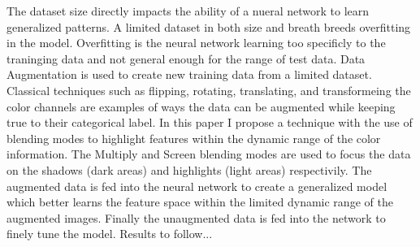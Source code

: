 % 
% 
%
The dataset size directly impacts the ability of a nueral network to learn generalized patterns.  A limited dataset in both size and breath breeds overfitting in the model.  Overfitting is the neural network learning too specificly to the traninging data and not general enough for the range of test data.  Data Augmentation is used to create new training data from a limited dataset.  Classical techniques such as flipping, rotating, translating, and transformeing the color channels are examples of ways the data can be augmented while keeping true to their categorical label.  In this paper I propose a technique with the use of blending modes to highlight features within the dynamic range of the color information.  The Multiply and Screen blending modes are used to focus the data on the shadows (dark areas) and highlights (light areas) respectivily.  The augmented data is fed into the neural network to create a generalized model which better learns the feature space within the limited dynamic range of the augmented images.  Finally the unaugmented data is fed into the network to finely tune the model.  Results to follow...